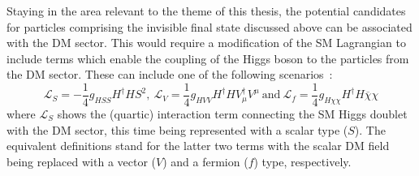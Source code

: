 \hspace{10pt} Staying in the area relevant to the theme of this thesis, the potential candidates for particles comprising the invisible final state discussed above can be associated with the DM sector. This would require a modification of the SM Lagrangian to include terms which enable the coupling of the Higgs boson to the particles from the DM sector. These can include one of the following scenarios~\cite{paper:hinv_run1, paper:hig_portal_models1,yellow_report}:
\begin{equation}
    \mathcal{L}_{S} = -\frac{1}{4}g_{HSS}H^\dagger H S^2,~\mathcal{L}_{V} = \frac{1}{4}g_{HVV}H^\dagger HV_\mu^\dagger V^\mu~\text{and}~\mathcal{L}_{f} = \frac{1}{4}g_{H\chi\chi}H^\dagger H\overline{\chi}\chi
\end{equation}
where $\mathcal{L}_{S}$ shows the (quartic) interaction term connecting the SM Higgs doublet with the DM sector, this time being represented with a scalar type ($S$). The equivalent definitions stand for the latter two terms with the scalar DM field being replaced with a vector ($V$) and a fermion ($f$) type, respectively.




